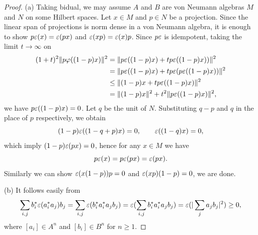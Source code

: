 \documentclass{../../large}
\begin{document}
\begin{proof}
(a)
Taking bidual, we may assume $A$ and $B$ are von Neumann algebras $M$ and $N$ on some Hilbert spaces.
Let $x\in M$ and $p\in N$ be a projection.
Since the linear span of projections is norm dense in a von Neumann algebra, it is enough to show $p\varepsilon(x)=\varepsilon(px)$ and $\varepsilon(xp)=\varepsilon(x)p$.
Since $p\varepsilon$ is idempotent, taking the limit $t\to\infty$ on
\begin{align*}
(1+t)^2\|p\varphi((1-p)x)\|^2
&=\|p\varepsilon((1-p)x)+tp\varepsilon((1-p)x))\|^2\\
&=\|p\varepsilon((1-p)x)+tp\varepsilon(p\varepsilon((1-p)x))\|^2\\
&\le\|(1-p)x+tp\varepsilon((1-p)x)\|^2\\
&=\|(1-p)x\|^2+t^2\|p\varepsilon((1-p)x)\|^2,
\end{align*}
we have $p\varepsilon((1-p)x)=0$.
Let $q$ be the unit of $N$.
Substituting $q-p$ and $q$ in the place of $p$ respectively, we obtain
\[(1-p)\varepsilon((1-q+p)x)=0,\qquad\varepsilon((1-q)x)=0,\]
which imply $(1-p)\varepsilon(px)=0$, hence for any $x\in M$ we have
\[p\varepsilon(x)=p\varepsilon(px)=\varepsilon(px).\]
Similarly we can show $\varepsilon(x(1-p))p=0$ and $\varepsilon(xp)(1-p)=0$, we are done.

(b)
It follows easily from
\[\sum_{i,j}b_i^*\varepsilon(a_i^*a_j)b_j=\sum_{i,j}\varepsilon(b_i^*a_i^*a_jb_j)=\varepsilon(\sum_{i,j}b_i^*a_i^*a_jb_j)=\varepsilon(|\sum_{j}a_jb_j|^2)\ge0,\]
where $[a_i]\in A^n$ and $[b_i]\in B^n$ for $n\ge1$.
\end{proof}
\end{document}
